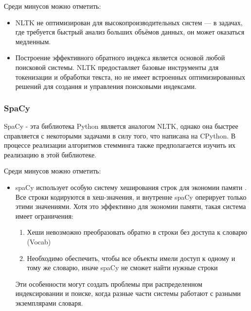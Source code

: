 Среди минусов можно отметить:
\begin{itemize}
    \item NLTK не оптимизирован для высокопроизводительных систем — в задачах, где требуется быстрый анализ 
    больших объёмов данных, он может оказаться медленным.
    \item Построение эффективного обратного индекса является основой любой поисковой системы. NLTK предоставляет базовые 
    инструменты для токенизации и обработки текста, но не имеет встроенных оптимизированных решений для создания и 
    управления поисковыми индексами. 
\end{itemize}

\subsubsection{SpaCy}
SpaCy \cite{spacy} - эта библиотека Python является аналогом NLTK, однако она быстрее справляется с некоторыми 
задачами в силу того, что написана на CPython. В процессе реализации алгоритмов стемминга также 
предполагается изучить их реализацию в этой библиотеке. 

Среди минусов можно отметить:
\begin{itemize}
    \item spaCy использует особую систему хеширования строк для экономии памяти \cite{spacy_troubles}. Все строки кодируются в хеш-значения, и внутренне spaCy оперирует только этими значениями. Хотя это эффективно для экономии памяти, такая система имеет ограничения:
    \begin{enumerate}
        \item Хеши невозможно преобразовать обратно в строки без доступа к словарю (Vocab)
        \item Необходимо обеспечить, чтобы все объекты имели доступ к одному и тому же словарю, иначе spaCy не сможет найти нужные строки
    \end{enumerate}
    Эти особенности могут создать проблемы при распределенном индексировании и поиске, когда разные части системы работают с разными экземплярами словаря.
\end{itemize}

